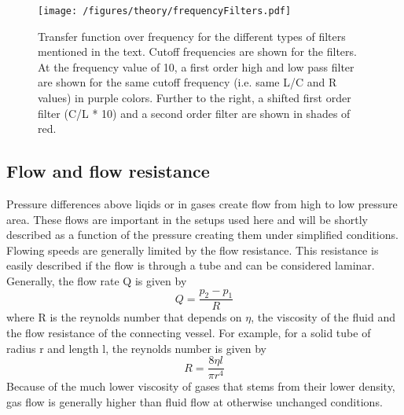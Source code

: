             \begin{figure}
                \label{figure:theory:frequencyFilter}
                \centering
                \texttt{[image: /figures/theory/frequencyFilters.pdf]}
                \caption[Frequency filters]{Transfer function over frequency for the different types of filters mentioned in the text. Cutoff frequencies are shown for the filters. At the frequency value of 10, a first order high and low pass filter are shown for the same cutoff frequency (i.e. same L/C and R values) in purple colors. Further to the right, a shifted first order filter (C/L * 10) and a second order filter are shown in shades of red.}
            \end{figure}
            \subsection{Flow and flow resistance}
                Pressure differences above liqids or in gases create flow from high to low pressure area. These flows are important in the setups used here and will be shortly described as a function of the pressure creating them under simplified conditions.
                Flowing speeds are generally limited by the flow resistance. This resistance is easily described if the flow is through a tube and can be considered laminar. Generally, the flow rate Q is given by
                \begin{equation}
                    Q=\frac{p_2-p_1}{R}
                \end{equation}
                where R is the reynolds number that depends on $\eta$, the viscosity of the fluid and the flow resistance of the connecting vessel. For example, for a solid tube of radius r and length l, the reynolds number is given by
                \begin{equation}
                    R=\frac{8\eta l}{\pi r^4}
                \end{equation}
                Because of the much lower viscosity of gases that stems from their lower density, gas flow is generally higher than fluid flow at otherwise unchanged conditions.
